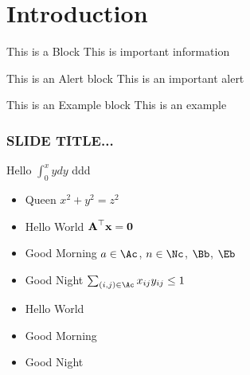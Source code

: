 



\frame[plain]{\titlepage}





\section[INTRO]{Introduction}

\begin{frame}

   \begin{block}{This is a Block}
      This is important information
   \end{block}

\pause

   \begin{alertblock}{This is an Alert block}
   This is an important alert
   \end{alertblock}

\pause

   \begin{exampleblock}{This is an Example block}
   This is an example 
   \end{exampleblock}

\end{frame}


\begin{frame}
\frametitle{SLIDE TITLE...}

Hello $\int_0^x y dy$ \alert<2>{ddd}
\begin{itemize}
\item Queen $x^2 + y^2 = z^2$
\item Hello World $\boldsymbol{\mathbf{A}}^\top \boldsymbol{\mathbf{x}} = \boldsymbol{\mathbf{0}}$
\item Good Morning $a\in\Ac$, $n\in\Nc$, $\Bb$, $\Eb$
\item Good Night $\sum_{(i,j)\in\Ac} x_{ij} y_{ij} \leq 1$ 
\end{itemize}

\begin{itemize}
\item<1-> Hello \alert{World}
\item<2-> Good \alert{Morning}
\item<3-> Good \alert{Night}
\end{itemize}

\end{frame}



